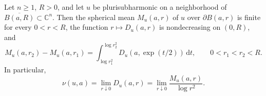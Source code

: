 \begin{theorem}\label{thm:euclidean-jensen-lelong}
Let $n\geq1$, $R>0$, and let $u$ be plurisubharmonic on a neighborhood of $\overline{B(a,R)}\subset\mathbb C^n$. Then the spherical mean $M_u(a,r)$ of $u$ over $\partial B(a,r)$ is finite for every $0<r<R$, the function $r\mapsto D_u(a,r)$ is nondecreasing on $(0,R)$, and
\begin{equation}\label{eq:euclidean-jensen-lelong}
 M_u(a,r_2)-M_u(a,r_1)
       =\int_{\log r_1^2}^{\log r_2^2}D_u(a,\exp(t/2))\,\mathrm dt,
       \qquad 0<r_1<r_2<R.
\end{equation}
In particular,
\begin{equation}\label{eq:lelong-density-limit}
 \nu(u,a)=\lim_{r\downarrow0}D_u(a,r)
          =\lim_{r\downarrow0}\frac{M_u(a,r)}{\log r^2}.
\end{equation}
\end{theorem}

